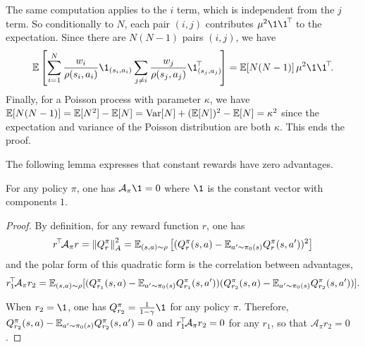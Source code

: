 \documentclass[11pt,a4paper]{article}
\newcommand{\AK}{\mathcal{A}}
\begin{document}
\begin{dem}
The same computation applies to the $i$ term, which is independent from
the $j$ term. So conditionally to $N$, each pair $(i,j)$ contributes
$\mu^2 \1\transp{\1}$ to the expectation.
Since there are $N(N-1)$ pairs $(i,j)$, we have
\begin{equation}
\E\left[
\sum_{i=1}^N\frac{w_i}{\rho(s_i,a_i)} \1_{(s_i,a_i)}
\sum_{j\neq i} \frac{w_j}{\rho(s_j,a_j)} \transp{\1_{(s_j,a_j)}}
\right]=\E[N(N-1)] \,\mu^2 \1\transp{\1}.
\end{equation}
Finally, for a Poisson process with parameter $\kappa$, we have
$\mathbb{E}[N(N-1)]=\mathbb{E}[N^2]-\mathbb{E}[N]=\operatorname{Var}[N]+(\mathbb{E}[N])^2-\mathbb{E}[N]=\kappa^2$ since the
expectation and variance of the Poisson distribution are both $\kappa$.
This ends the proof.
\end{dem}

The following lemma expresses that constant rewards have zero advantages.

\begin{lem}
\label{lem:A1}
For any policy $\pi$, one has $\AK_\pi\1=0$ where $\1$ is the constant
vector with components $1$.
\end{lem}

\begin{proof}
By definition, for any reward function $r$, one has
\begin{equation}
\transp{r}\AK_\pi r= \norm{Q^\pi_r}^2_A= \E_{(s,a)\sim \rho}\left[
(Q^\pi_r(s,a)-\E_{a'\sim \pi_0(s)} Q^\pi_r(s,a'))^2\right]
\end{equation}
and the polar form of this quadratic form is the correlation between
advantages,
\begin{equation}
\transp{r_1}\AK_\pi r_2= \E_{(s,a)\sim \rho}[
(Q^\pi_{r_1}(s,a)-\E_{a'\sim \pi_0(s)} Q^\pi_{r_1}(s,a'))
(Q^\pi_{r_2}(s,a)-\E_{a'\sim \pi_0(s)} Q^\pi_{r_2}(s,a'))
].
\end{equation}

When $r_2=\1$, one has $Q^\pi_{r_2}=\frac{1}{1-\gamma}\1$ for any policy
$\pi$. Therefore, $Q^\pi_{r_2}(s,a)-\mathbb{E}_{a'\sim \pi_0(s)}
Q^\pi_{r_2}(s,a')=0$ and $\transp{r_1}\AK_\pi r_2=0$ for any $r_1$, so
that $\AK_\pi r_2=0$.
\end{proof}
\end{document}
